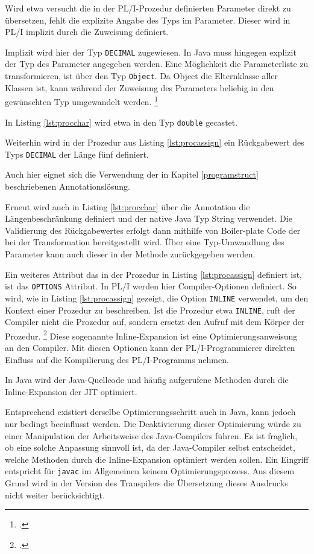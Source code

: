 Wird etwa versucht die in der PL/I-Prozedur definierten Parameter direkt zu übersetzen, fehlt die explizite Angabe des Typs im Parameter. Dieser wird in PL/I implizit durch die Zuweisung definiert.

Implizit wird hier der Typ \verb+DECIMAL+ zugewiesen. 
In Java muss hingegen explizit der Typ des Parameter angegeben werden.
Eine M\"oglichkeit die Parameterliste zu transformieren, ist über den Typ \verb+Object+.
Da Object die Elternklasse aller Klassen ist, kann während der Zuweisung des Parameters beliebig in den gewünschten Typ umgewandelt werden. \footcite[Vgl. ][]{objectdocs}

In Listing \ref{lst:procchar} wird etwa in den Typ \verb+double+ gecastet.

Weiterhin wird in der Prozedur aus Listing \ref{lst:procassign} ein R\"uckgabewert des Typs \verb+DECIMAL+ der L\"ange f\"unf definiert.

Auch hier eignet sich die Verwendung der in Kapitel \ref{programstruct} beschriebenen Annotationslösung.

Erneut wird auch in Listing \ref{lst:procchar} über die Annotation die Längenbeschränkung definiert und der native Java Typ String verwendet.
Die Validierung des Rückgabewertes erfolgt dann mithilfe von Boiler-plate Code der bei der Transformation bereitgestellt wird.
Über eine Typ-Umwandlung des Parameter kann auch dieser in der Methode zurückgegeben werden. 

Ein weiteres Attribut das in der Prozedur in Listing \ref{lst:procassign} definiert ist, ist das \verb+OPTIONS+
Attribut.
In PL/I werden hier Compiler-Optionen definiert. So wird, wie in Listing \ref{lst:procassign} gezeigt, die Option \verb+INLINE+ verwendet, um den Kontext einer Prozedur zu beschreiben. Ist die Prozedur etwa \verb+INLINE+, ruft der Compiler nicht die Prozedur auf, sondern ersetzt den Aufruf mit dem Körper der Prozedur. \footcite[Vgl.][]{optionsstmt} Diese sogenannte Inline-Expansion ist eine Optimierungsanweisung an den Compiler. Mit diesen Optionen kann der PL/I-Programmierer direkten Einfluss auf die Kompilierung des PL/I-Programms nehmen.

In Java wird der Java-Quellcode und häufig aufgerufene Methoden durch die Inline-Expansion der \ac{JIT} optimiert.

Entsprechend existiert derselbe Optimierungsschritt auch in Java, kann jedoch nur bedingt beeinflusst werden. Die Deaktivierung dieser Optimierung würde zu einer Manipulation der Arbeitsweise des Java-Compilers führen. Es ist fraglich, ob eine solche Anpassung sinnvoll ist, da der Java-Compiler selbst entscheidet, welche Methoden durch die Inline-Expansion optimiert werden sollen. Ein Eingriff entspricht für \verb+javac+ im Allgemeinen keinem Optimierungsprozess.
Aus diesem Grund wird in der Version des Transpilers die Übersetzung dieses Ausdrucks nicht weiter berücksichtigt.


